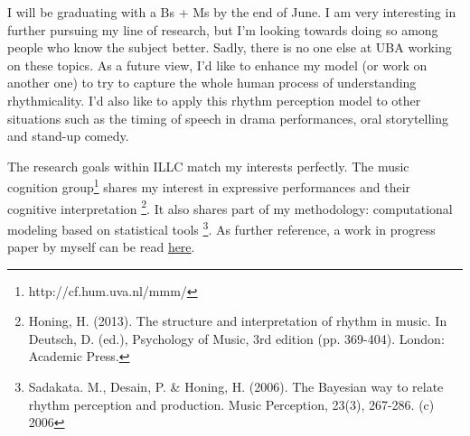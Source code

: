 \documentclass[a4paper]{letter}
\begin{document}
\begin{letter}{}


I will be graduating with a Bs + Ms by the end of June. I am very interesting
in further pursuing my line of research, but I'm looking towards doing so among
people who know the subject better. Sadly, there is no one else at UBA working
on these topics. As a future view, I'd like to enhance my model (or work on
another one) to try to capture the whole human process of understanding
rhythmicality. I'd also like to apply this rhythm perception model to other
situations such as the timing of speech in drama performances, oral
storytelling and stand-up comedy.

The research goals within ILLC match my interests perfectly. The
music cognition group\footnote{http://cf.hum.uva.nl/mmm/} shares my interest in
expressive performances and their cognitive interpretation%
\footnote{Honing, H. (2013).  The structure and interpretation of rhythm in
music. In Deutsch, D. (ed.), Psychology of Music, 3rd edition (pp.
369-404). London: Academic Press.}. It also shares part of my methodology:
computational modeling based on statistical tools%
\footnote{Sadakata. M., Desain, P. \& Honing, H. (2006). The Bayesian way
to relate rhythm perception and production. Music Perception, 23(3), 267-286.
(c) 2006}. As further reference, a work in progress paper by myself can be
read \href{
https://drive.google.com/file/d/0BzNsqva23xUGal9Bdl8xYWJOeHM/view?usp=sharing}%
{here}.


\end{letter}
\end{document}
